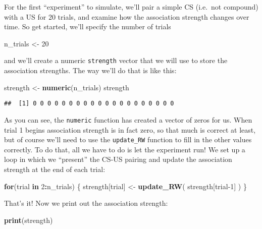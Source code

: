 \documentclass[]{book}
\newenvironment{Shaded}{\begin{snugshade}}{\end{snugshade}}
\newcommand{\ControlFlowTok}[1]{\textcolor[rgb]{0.13,0.29,0.53}{\textbf{#1}}}
\newcommand{\DecValTok}[1]{\textcolor[rgb]{0.00,0.00,0.81}{#1}}
\newcommand{\KeywordTok}[1]{\textcolor[rgb]{0.13,0.29,0.53}{\textbf{#1}}}
\newcommand{\NormalTok}[1]{#1}
\newcommand{\OperatorTok}[1]{\textcolor[rgb]{0.81,0.36,0.00}{\textbf{#1}}}
\newcommand{\StringTok}[1]{\textcolor[rgb]{0.31,0.60,0.02}{#1}}
\begin{document}
For the first ``experiment'' to simulate, we'll pair a simple CS (i.e.~not compound) with a US for 20 trials, and examine how the association strength changes over time. So get started, we'll specify the number of trials

\begin{Shaded}
\begin{Highlighting}[]
\NormalTok{n_trials <-}\StringTok{ }\DecValTok{20}  
\end{Highlighting}
\end{Shaded}

and we'll create a numeric \texttt{strength} vector that we will use to store the association strengths. The way we'll do that is like this:

\begin{Shaded}
\begin{Highlighting}[]
\NormalTok{strength <-}\StringTok{ }\KeywordTok{numeric}\NormalTok{(n_trials)}
\NormalTok{strength}
\end{Highlighting}
\end{Shaded}

\begin{verbatim}
##  [1] 0 0 0 0 0 0 0 0 0 0 0 0 0 0 0 0 0 0 0 0
\end{verbatim}

As you can see, the \texttt{numeric} function has created a vector of zeros for us. When trial 1 begins association strength is in fact zero, so that much is correct at least, but of course we'll need to use the \texttt{update\_RW} function to fill in the other values correctly. To do that, all we have to do is let the experiment run! We set up a loop in which we ``present'' the CS-US pairing and update the association strength at the end of each trial:

\begin{Shaded}
\begin{Highlighting}[]
\ControlFlowTok{for}\NormalTok{(trial }\ControlFlowTok{in} \DecValTok{2}\OperatorTok{:}\NormalTok{n_trials) \{}
\NormalTok{  strength[trial] <-}\StringTok{ }\KeywordTok{update_RW}\NormalTok{( strength[trial}\DecValTok{-1}\NormalTok{] )}
\NormalTok{\}}
\end{Highlighting}
\end{Shaded}

That's it! Now we print out the association strength:

\begin{Shaded}
\begin{Highlighting}[]
\KeywordTok{print}\NormalTok{(strength)}
\end{Highlighting}
\end{Shaded}
\end{document}
